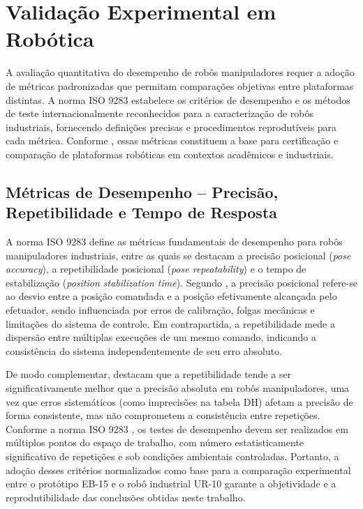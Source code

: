 \section{Validação Experimental em Robótica}

A avaliação quantitativa do desempenho de robôs manipuladores requer a adoção de métricas padronizadas que permitam comparações objetivas entre plataformas distintas. A norma ISO 9283 \cite{iso9283} estabelece os critérios de desempenho e os métodos de teste internacionalmente reconhecidos para a caracterização de robôs industriais, fornecendo definições precisas e procedimentos reprodutíveis para cada métrica. Conforme , essas métricas constituem a base para certificação e comparação de plataformas robóticas em contextos acadêmicos e industriais.

\subsection{Métricas de Desempenho -- Precisão, Repetibilidade e Tempo de Resposta}

A norma ISO 9283 \cite{iso9283} define as métricas fundamentais de desempenho para robôs manipuladores industriais, entre as quais se destacam a precisão posicional (\textit{pose accuracy}), a repetibilidade posicional (\textit{pose repeatability}) e o tempo de estabilização (\textit{position stabilization time}). Segundo , a precisão posicional refere-se ao desvio entre a posição comandada e a posição efetivamente alcançada pelo efetuador, sendo influenciada por erros de calibração, folgas mecânicas e limitações do sistema de controle. Em contrapartida, a repetibilidade mede a dispersão entre múltiplas execuções de um mesmo comando, indicando a consistência do sistema independentemente de seu erro absoluto.

De modo complementar,  destacam que a repetibilidade tende a ser significativamente melhor que a precisão absoluta em robôs manipuladores, uma vez que erros sistemáticos (como imprecisões na tabela DH) afetam a precisão de forma consistente, mas não comprometem a consistência entre repetições. Conforme a norma ISO 9283 \cite{iso9283}, os testes de desempenho devem ser realizados em múltiplos pontos do espaço de trabalho, com número estatisticamente significativo de repetições e sob condições ambientais controladas. Portanto, a adoção desses critérios normalizados como base para a comparação experimental entre o protótipo EB-15 e o robô industrial UR-10 garante a objetividade e a reprodutibilidade das conclusões obtidas neste trabalho.
